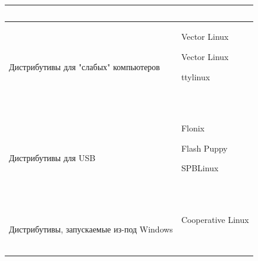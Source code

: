 \documentclass[bachelor, och, pract, times]{SCWorks}
\begin{document}
\begin{longtable}{|p{}|p{}|}
\begin{minipage}{\textwidth}
        ~
    \end{minipage}
    \\\hline
    Дистрибутивы для "слабых" компьютеров &
    \begin{minipage}{\textwidth}
        \begin{list}{•}{~}
            \item Vector Linux
            \item Vector Linux
            \item ttylinux
        \end{list}
        ~
    \end{minipage}
    \\\hline
    Дистрибутивы для USB &
    \begin{minipage}{\textwidth}
        \begin{list}{•}{~}
            \item Flonix
            \item Flash Puppy
            \item SPBLinux
        \end{list}
        ~
    \end{minipage}
    \\\hline
    Дистрибутивы, запускаемые из-под Windows &
    \begin{minipage}{\textwidth}
        \begin{list}{•}{~}
            \item Cooperative Linux
        \end{list}
        ~
    \end{minipage}
    \hline
\end{longtable}
\end{document}
